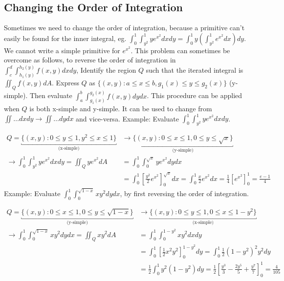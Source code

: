 \documentclass{article}
\newcommand{\nn}{\leavevmode \newline \newline} %
\numberwithin{equation}{subsection} %
\begin{document}
\subsection{Changing the Order of Integration}
Sometimes we need to change the order of integration, because a primitive can't easily be found for the inner integral, eg. $\int_0^1 \int_{y^2}^1 ye^{x^2} dx dy = \int_0^1 y\left( \int_{y^2}^1 e^{x^2} dx \right) dy$. We cannot write a simple primitive for $e^{x^2}$. This problem can sometimes be overcome as follows, to reverse the order of integration in $\int_c^d \int_{h_1(y)}^{h_2(y)} f(x,y)dxdy$, Identify the region $Q$ such that the iterated integral is $\iint_Q f(x,y)dA$. Express $Q$ as $\{(x,y): a \leq x \leq b, g_1(x) \leq y \leq g_2(x) \}$ (y-simple). Then evaluate $\int_a^b \int_{g_1(x)}^{g_2(x)} f(x,y) dy dx$. This procedure can be applied when $Q$ is both x-simple and y-simple. It can be used to change from $\iint \ldots dxdy \to \iint \ldots dydx$ and vice-versa.
\nn
Example: Evaluate $\int_0^1 \int_{y^2}^1 ye^{x^2} dxdy$.

\begin{equation}
    \begin{split}
        Q = \underbracket{\{ (x,y): 0 \leq y \leq 1, y^2 \leq x \leq 1 \}}_{\text{(x-simple)}} &\to \underbracket{\{ (x,y) : 0 \leq x \leq 1 , 0 \leq y \leq \sqrt{x} \}}_{\text{(y-simple)}} \\
        \to \int_0^1 \int_{y^2}^1 ye^{x^2} dxdy = \iint_Q ye^{x^2} dA &= \int_0^1 \int_0^{\sqrt{x}} ye^{x^2} dydx \\
        &= \int_0^1 \left[ \frac{y^2}{2}e^{x^2}\right]_0^{\sqrt{x}}dx = \int_0^1 \frac{x}{2}e^{x^2}dx = \frac{1}{4}\left[e^{x^2}\right]_0^1 = \frac{e-1}{4}
    \end{split}
\end{equation}
\nn
Example: Evaluate $\int_0^1\int_0^{\sqrt{1-x}} xy^2dydx$, by first reversing the order of integration.

\begin{equation}
    \begin{split}
        Q = \underbracket{\{ (x,y) : 0 \leq x \leq 1, 0 \leq y \leq \sqrt{1-x} \}}_{\text{(y-simple)}} &\to \underbracket{\{ (x,y) : 0 \leq y \leq 1, 0 \leq x \leq 1-y^2 \}}_{\text{(x-simple)}} \\
        \to \int_0^1 \int_0^{\sqrt{1-x}} xy^2 dydx = \iint_Q xy^2 dA &= \int_0^1 \int_0^{1-y^2} xy^2 dxdy \\
        &= \int_0^1 \left[ \frac{1}{2}x^2y^2\right]_0^{1-y^2} dy = \int_0^1 \frac{1}{2}(1-y^2)^2 y^2 dy \\
        &= \frac{1}{2}\int_0^1 y^2(1-y^2)dy = \frac{1}{2}\left[ \frac{y^3}{3} - \frac{2y^5}{5} + \frac{y^7}{7} \right]_0^1 = \frac{4}{105}
    \end{split}
\end{equation}
\end{document}
